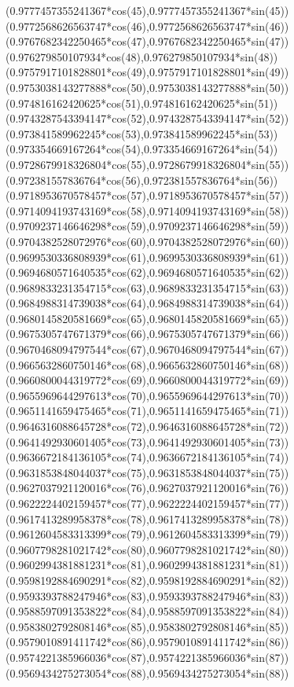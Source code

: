 {({0.9777457355241367*cos(45)},{0.9777457355241367*sin(45)})
({0.9772568626563747*cos(46)},{0.9772568626563747*sin(46)})
({0.9767682342250465*cos(47)},{0.9767682342250465*sin(47)})
({0.976279850107934*cos(48)},{0.976279850107934*sin(48)})
({0.9757917101828801*cos(49)},{0.9757917101828801*sin(49)})
({0.9753038143277888*cos(50)},{0.9753038143277888*sin(50)})
({0.974816162420625*cos(51)},{0.974816162420625*sin(51)})
({0.9743287543394147*cos(52)},{0.9743287543394147*sin(52)})
({0.973841589962245*cos(53)},{0.973841589962245*sin(53)})
({0.973354669167264*cos(54)},{0.973354669167264*sin(54)})
({0.9728679918326804*cos(55)},{0.9728679918326804*sin(55)})
({0.972381557836764*cos(56)},{0.972381557836764*sin(56)})
({0.9718953670578457*cos(57)},{0.9718953670578457*sin(57)})
({0.9714094193743169*cos(58)},{0.9714094193743169*sin(58)})
({0.9709237146646298*cos(59)},{0.9709237146646298*sin(59)})
({0.9704382528072976*cos(60)},{0.9704382528072976*sin(60)})
({0.9699530336808939*cos(61)},{0.9699530336808939*sin(61)})
({0.9694680571640535*cos(62)},{0.9694680571640535*sin(62)})
({0.9689833231354715*cos(63)},{0.9689833231354715*sin(63)})
({0.9684988314739038*cos(64)},{0.9684988314739038*sin(64)})
({0.9680145820581669*cos(65)},{0.9680145820581669*sin(65)})
({0.9675305747671379*cos(66)},{0.9675305747671379*sin(66)})
({0.9670468094797544*cos(67)},{0.9670468094797544*sin(67)})
({0.9665632860750146*cos(68)},{0.9665632860750146*sin(68)})
({0.9660800044319772*cos(69)},{0.9660800044319772*sin(69)})
({0.9655969644297613*cos(70)},{0.9655969644297613*sin(70)})
({0.9651141659475465*cos(71)},{0.9651141659475465*sin(71)})
({0.9646316088645728*cos(72)},{0.9646316088645728*sin(72)})
({0.9641492930601405*cos(73)},{0.9641492930601405*sin(73)})
({0.9636672184136105*cos(74)},{0.9636672184136105*sin(74)})
({0.9631853848044037*cos(75)},{0.9631853848044037*sin(75)})
({0.9627037921120016*cos(76)},{0.9627037921120016*sin(76)})
({0.9622224402159457*cos(77)},{0.9622224402159457*sin(77)})
({0.9617413289958378*cos(78)},{0.9617413289958378*sin(78)})
({0.9612604583313399*cos(79)},{0.9612604583313399*sin(79)})
({0.9607798281021742*cos(80)},{0.9607798281021742*sin(80)})
({0.9602994381881231*cos(81)},{0.9602994381881231*sin(81)})
({0.9598192884690291*cos(82)},{0.9598192884690291*sin(82)})
({0.9593393788247946*cos(83)},{0.9593393788247946*sin(83)})
({0.9588597091353822*cos(84)},{0.9588597091353822*sin(84)})
({0.9583802792808146*cos(85)},{0.9583802792808146*sin(85)})
({0.9579010891411742*cos(86)},{0.9579010891411742*sin(86)})
({0.9574221385966036*cos(87)},{0.9574221385966036*sin(87)})
({0.9569434275273054*cos(88)},{0.9569434275273054*sin(88)})
}
